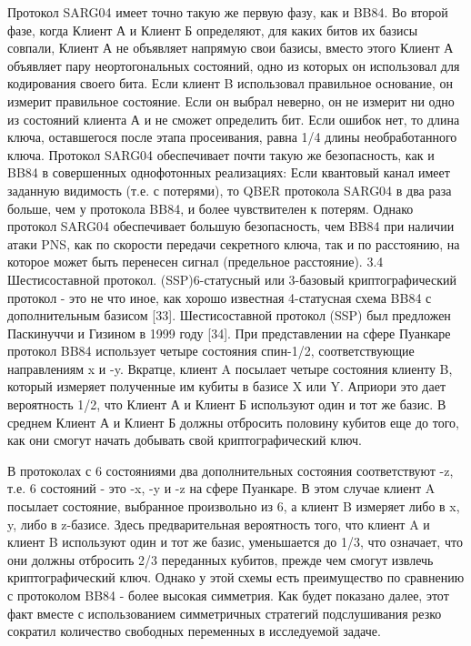 Протокол SARG04 имеет точно такую же первую фазу, как и BB84. Во второй фазе, когда Клиент А и Клиент Б определяют, для каких битов их базисы совпали, Клиент А не объявляет напрямую свои базисы, вместо этого Клиент А объявляет пару неортогональных состояний, одно из которых он использовал для кодирования своего бита. Если клиент B использовал правильное основание, он измерит правильное состояние. Если он выбрал неверно, он не измерит ни одно из состояний клиента А и не сможет определить бит. Если ошибок нет, то длина ключа, оставшегося после этапа просеивания, равна 1/4 длины необработанного ключа. Протокол SARG04 обеспечивает почти такую же безопасность, как и BB84 в совершенных однофотонных реализациях: Если квантовый канал имеет заданную видимость (т.е. с потерями), то QBER протокола SARG04 в два раза больше, чем у протокола BB84, и более чувствителен к потерям.
Однако протокол SARG04 обеспечивает большую безопасность, чем BB84 при наличии атаки PNS, как по скорости передачи секретного ключа, так и по расстоянию, на которое может быть перенесен сигнал (предельное расстояние).
3.4 Шестисоставной протокол. (SSP)6-статусный или 3-базовый криптографический протокол - это не что иное, как хорошо известная 4-статусная схема BB84 с дополнительным базисом [33]. Шестисоставной протокол (SSP) был предложен Паскинуччи и Гизином в 1999 году [34].
При представлении на сфере Пуанкаре протокол BB84 использует четыре состояния спин-1/2, соответствующие направлениям x и -y. Вкратце, клиент A посылает четыре состояния клиенту B, который измеряет полученные им кубиты в базисе X или Y. Априори это дает вероятность 1/2, что Клиент А и Клиент Б используют один и тот же базис. В среднем Клиент А и Клиент Б должны отбросить половину кубитов еще до того, как они смогут начать добывать свой криптографический ключ.

В протоколах с 6 состояниями два дополнительных состояния соответствуют -z, т.е. 6 состояний - это -x, -y и -z на сфере Пуанкаре. В этом случае клиент A посылает состояние, выбранное произвольно из 6, а клиент B измеряет либо в x, y, либо в z-базисе. Здесь предварительная вероятность того, что клиент A и клиент B используют один и тот же базис, уменьшается до 1/3, что означает, что они должны отбросить 2/3 переданных кубитов, прежде чем смогут извлечь криптографический ключ.
Однако у этой схемы есть преимущество по сравнению с протоколом BB84 - более высокая симметрия. Как будет показано далее, этот факт вместе с использованием симметричных стратегий подслушивания резко сократил количество свободных переменных в исследуемой задаче.
